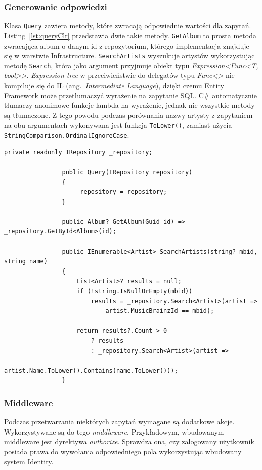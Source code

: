 		\subsubsection*{Generowanie odpowiedzi}
			Klasa \verb|Query| zawiera metody, które zwracają odpowiednie wartości dla zapytań.
			Listing~\ref{lst:queryClr} przedstawia dwie takie metody.
			\verb|GetAlbum| to prosta metoda zwracająca album o danym id z repozytorium, którego implementacja znajduje się w warstwie Infrastructure.
			\verb|SearchArtists| wyszukuje artystów wykorzystując metodę \verb|Search|, która jako argument przyjmuje obiekt typu \emph{Expression<Func<T, bool>>}.
			\emph{Expression tree} w przeciwieństwie do delegatów typu \emph{Func<>} nie kompiluje się do IL (ang.\ \emph{Intermediate Language}),
			dzięki czemu Entity Framework może przetłumaczyć wyrażenie na zapytanie SQL.
			C\# automatycznie tłumaczy anonimowe funkcje lambda na wyrażenie, jednak nie wszystkie metody są tłumaczone.
			Z tego powodu podczas porównania nazwy artysty z zapytaniem na obu argumentach wykonywana jest funkcja \verb|ToLower()|,
			zamiast użycia \verb|StringComparison.OrdinalIgnoreCase|.

			\begin{lstlisting}[label=lst:queryClr, caption=Fragment klasy Query, float]
				private readonly IRepository _repository;
		
				public Query(IRepository repository)
				{
					_repository = repository;
				}

				public Album? GetAlbum(Guid id) => _repository.GetById<Album>(id);

				public IEnumerable<Artist> SearchArtists(string? mbid, string name)
				{
					List<Artist>? results = null;
					if (!string.IsNullOrEmpty(mbid))
						results = _repository.Search<Artist>(artist =>
							artist.MusicBrainzId == mbid);
		
					return results?.Count > 0
						? results
						: _repository.Search<Artist>(artist =>
							artist.Name.ToLower().Contains(name.ToLower()));
				}
			\end{lstlisting}

		\subsubsection*{Middleware}
			Podczas przetwarzania niektórych zapytań wymagane są dodatkowe akcje.
			Wykorzystywane są do tego \emph{middleware}.
			Przykładowym, wbudowanym middleware jest dyrektywa \emph{authorize}.
			Sprawdza ona, czy zalogowany użytkownik posiada prawa do wywołania odpowiedniego pola wykorzystując wbudowany system Identity.
			
